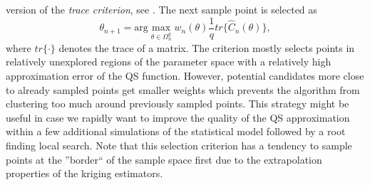 \documentclass[article, nojss]{jss}
\numberwithin{equation}{section}			%
\begin{document}
version of the \emph{trace criterion}, see \citet{ref:Puk2006}. The next sample
point is selected as
\[
  \theta_{n+1} = \text{arg}\max_{\theta\in\Omega^{g}_n}w_n(\theta) \frac{1}{q}tr\{\hat{C}_n(\theta)\},
\]
where $tr\{\cdot\}$ denotes the trace of a matrix. The criterion mostly selects
points in relatively unexplored regions of the parameter space with a
relatively high approximation error of the QS function. However, potential
candidates more close to already sampled points get smaller weights which prevents
the algorithm from clustering too much around previously sampled points.
This strategy might be useful in case we rapidly want to improve the quality of the QS
approximation within a few additional simulations of the statistical model
followed by a root finding local search. Note that this selection criterion has
a tendency to sample points at the ''border`` of the sample space first due
to the extrapolation properties of the kriging estimators.\par
%
\end{document}
